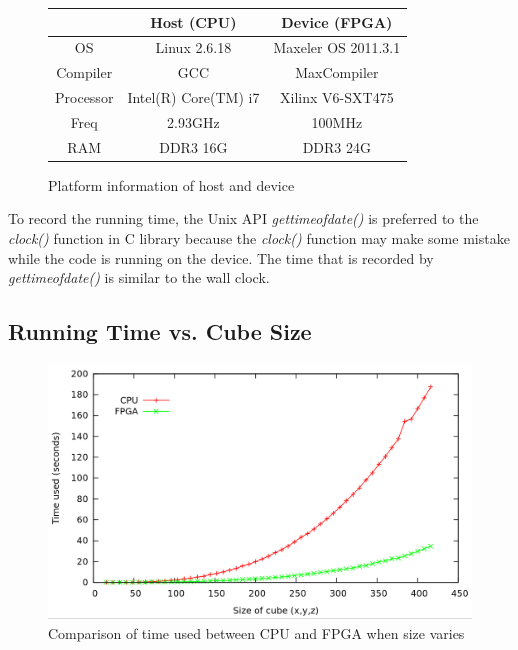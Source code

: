 \begin{figure}
\begin{centering}
\begin{tabular}{|c|c|c|}
\hline
 & Host (CPU) & Device (FPGA)\tabularnewline
\hline
\hline
OS & Linux 2.6.18 & Maxeler OS 2011.3.1\tabularnewline
\hline
Compiler & GCC & MaxCompiler\tabularnewline
\hline
Processor & Intel(R) Core(TM) i7 & Xilinx V6-SXT475\tabularnewline
\hline
Freq & 2.93GHz & 100MHz\tabularnewline
\hline
RAM & DDR3 16G & DDR3 24G\tabularnewline
\hline
\end{tabular}
\par\end{centering}

\caption{\label{fig:Platform-information-of}Platform information of host and
device}


\end{figure}

To record the running time, the Unix API \emph{gettimeofdate()} is preferred
to the \emph{clock()} function in C library because the
\emph{clock()} function may make some mistake while the code is running on
the device. The time that is recorded by \emph{gettimeofdate()} is similar
to the wall clock.

\label{ssub:Platform information}


\subsection{Running Time vs. Cube Size}
\label{sub:Running Time vs. Cube Si}


\begin{figure}
  \centering
  \includegraphics[scale=0.3]{img/t10size16to256.png}
  \caption{Comparison of time used between CPU and FPGA when size varies}
  \label{fig:comparison_1}
\end{figure}

